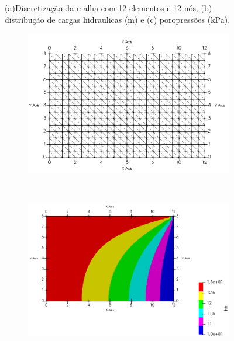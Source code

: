 \documentclass{article} %
\begin{document}
\begin{figure}[H]
\begin{subfigure}[b]{0.49\textwidth}
		\caption{}
		\label{}
	\end{subfigure}
	\caption{(a)Discretização da malha com 12 elementos e 12 nós, (b) distribução de cargas hidraulicas (m) e (c) poropressões (kPa).}\label{}
\end{figure}

\begin{figure}[H]
	\centering
	\begin{subfigure}[b]{0.41\textwidth}
		\includegraphics[width=\textwidth]{option1_b}
		\caption{}
		\label{}
	\end{subfigure}\\
	\begin{subfigure}[b]{0.49\textwidth}
		\includegraphics[width=\textwidth]{option1_bhh}
		\caption{}
		\label{}
	\end{subfigure}
	\begin{subfigure}[b]{0.49\textwidth}

\end{subfigure}
\end{figure}
\end{document}
